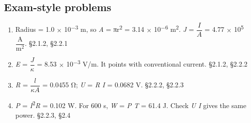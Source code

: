 \documentclass[11pt]{article}
\begin{document}
\begin{keepsection}\subsection{Exam-style problems}

\begin{enumerate}
\item Radius = 1.0 \ensuremath{\times} 10\textsuperscript{\ensuremath{-}3} m, so \textit{A} = πr\textsuperscript{2} = 3.14 \ensuremath{\times} 10\textsuperscript{\ensuremath{-}6} m\textsuperscript{2}. \textit{J} = {\small\ensuremath{\dfrac{{I}}{{A}}}} = 4.77 \ensuremath{\times} 10\textsuperscript{5} {\small\ensuremath{\dfrac{\mathrm{A}}{\mathrm{m}^{2}}}}. \hfill{\small\color{FAUblue}§2.1.2, §2.2.1}
\item \textit{E} = {\small\ensuremath{\dfrac{{J}}{κ}}} = 8.53 \ensuremath{\times} 10\textsuperscript{\ensuremath{-}3} V/m. It points with conventional current. \hfill{\small\color{FAUblue}§2.1.2, §2.2.2}
\item \textit{R} = {\small\ensuremath{\dfrac{{l}}{κ{A}}}} = 0.0455 Ω; \textit{U} = \textit{R I} = 0.0682 V. \hfill{\small\color{FAUblue}§2.2.2, §2.2.3}
\item \textit{P} = \textit{I}\textsuperscript{2}\textit{R} = 0.102 W. For 600 s, \textit{W} = \textit{P T} = 61.4 J. Check \textit{U I} gives the same power. \hfill{\small\color{FAUblue}§2.2.3, §2.4}
\end{enumerate}

\end{keepsection}
\end{document}
